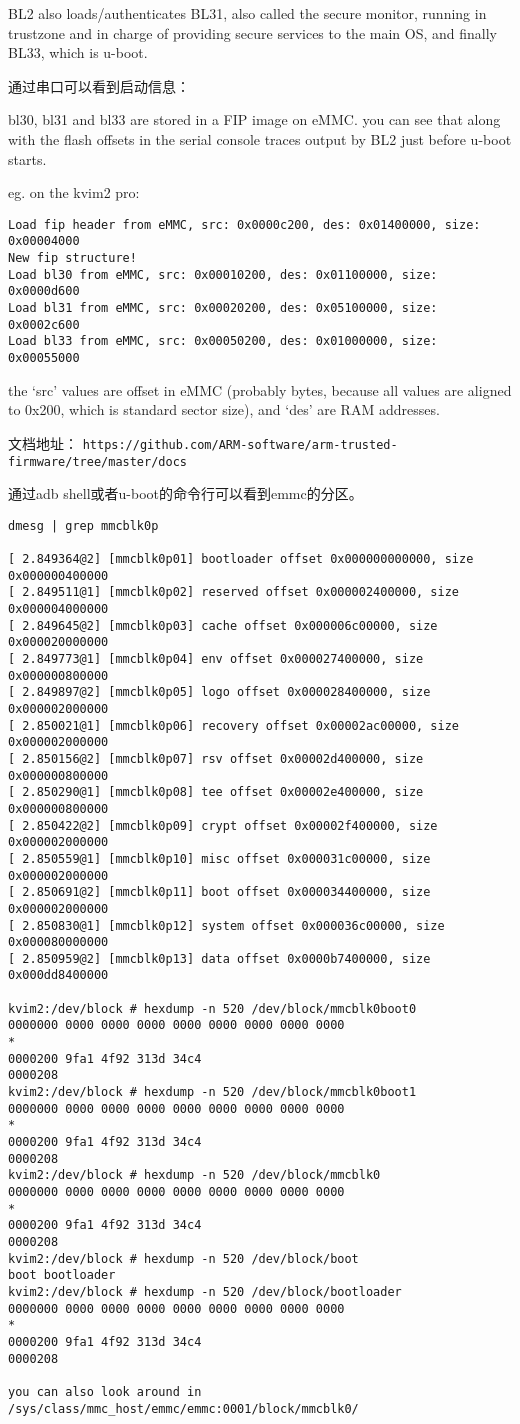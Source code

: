 BL2 also loads/authenticates BL31, also called the secure monitor, running 
in trustzone and in charge of providing secure services to the main OS, and 
finally BL33, which is u-boot.

通过串口可以看到启动信息：


bl30, bl31 and bl33 are stored in a FIP image on eMMC.
you can see that along with the flash offsets in the serial 
console traces output by BL2 just before u-boot starts.

eg. on the kvim2 pro:
\begin{verbatim}
Load fip header from eMMC, src: 0x0000c200, des: 0x01400000, size: 0x00004000
New fip structure!
Load bl30 from eMMC, src: 0x00010200, des: 0x01100000, size: 0x0000d600
Load bl31 from eMMC, src: 0x00020200, des: 0x05100000, size: 0x0002c600
Load bl33 from eMMC, src: 0x00050200, des: 0x01000000, size: 0x00055000
\end{verbatim}
the ‘src’ values are offset in eMMC (probably bytes, because all
values are aligned to 0x200, which is standard sector size), and
‘des’ are RAM addresses.

文档地址：
\verb|https://github.com/ARM-software/arm-trusted-firmware/tree/master/docs|

通过adb shell或者u-boot的命令行可以看到emmc的分区。

\begin{verbatim}
dmesg | grep mmcblk0p

[ 2.849364@2] [mmcblk0p01] bootloader offset 0x000000000000, size 0x000000400000
[ 2.849511@1] [mmcblk0p02] reserved offset 0x000002400000, size 0x000004000000
[ 2.849645@2] [mmcblk0p03] cache offset 0x000006c00000, size 0x000020000000
[ 2.849773@1] [mmcblk0p04] env offset 0x000027400000, size 0x000000800000
[ 2.849897@2] [mmcblk0p05] logo offset 0x000028400000, size 0x000002000000
[ 2.850021@1] [mmcblk0p06] recovery offset 0x00002ac00000, size 0x000002000000
[ 2.850156@2] [mmcblk0p07] rsv offset 0x00002d400000, size 0x000000800000
[ 2.850290@1] [mmcblk0p08] tee offset 0x00002e400000, size 0x000000800000
[ 2.850422@2] [mmcblk0p09] crypt offset 0x00002f400000, size 0x000002000000
[ 2.850559@1] [mmcblk0p10] misc offset 0x000031c00000, size 0x000002000000
[ 2.850691@2] [mmcblk0p11] boot offset 0x000034400000, size 0x000002000000
[ 2.850830@1] [mmcblk0p12] system offset 0x000036c00000, size 0x000080000000
[ 2.850959@2] [mmcblk0p13] data offset 0x0000b7400000, size 0x000dd8400000

kvim2:/dev/block # hexdump -n 520 /dev/block/mmcblk0boot0
0000000 0000 0000 0000 0000 0000 0000 0000 0000
*
0000200 9fa1 4f92 313d 34c4
0000208
kvim2:/dev/block # hexdump -n 520 /dev/block/mmcblk0boot1
0000000 0000 0000 0000 0000 0000 0000 0000 0000
*
0000200 9fa1 4f92 313d 34c4
0000208
kvim2:/dev/block # hexdump -n 520 /dev/block/mmcblk0
0000000 0000 0000 0000 0000 0000 0000 0000 0000
*
0000200 9fa1 4f92 313d 34c4
0000208
kvim2:/dev/block # hexdump -n 520 /dev/block/boot
boot bootloader
kvim2:/dev/block # hexdump -n 520 /dev/block/bootloader
0000000 0000 0000 0000 0000 0000 0000 0000 0000
*
0000200 9fa1 4f92 313d 34c4
0000208

you can also look around in /sys/class/mmc_host/emmc/emmc:0001/block/mmcblk0/
\end{verbatim}

